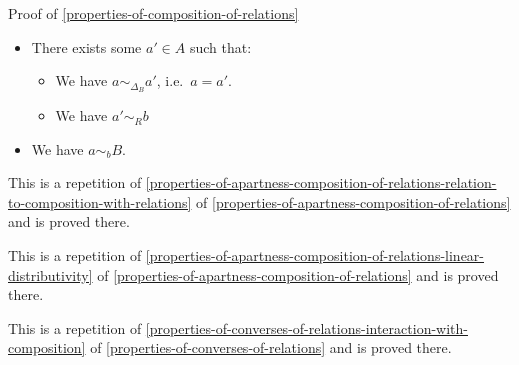 \begin{Proof}{Proof of \cref{properties-of-composition-of-relations}}
\begin{itemize}
            \begin{itemize}
                \item There exists some $a'\in A$ such that:
                    \begin{itemize}
                        \item We have $a\sim_{\Delta_{B}}a'$, i.e.\ $a=a'$.
                        \item We have $a'\sim_{R}b$
                    \end{itemize}
                \item We have $a\sim_{b}B$.
            \end{itemize}
    \end{itemize}

    This is a repetition of \cref{properties-of-apartness-composition-of-relations-relation-to-composition-with-relations} of \cref{properties-of-apartness-composition-of-relations} and is proved there.

    This is a repetition of \cref{properties-of-apartness-composition-of-relations-linear-distributivity} of \cref{properties-of-apartness-composition-of-relations} and is proved there.

    This is a repetition of \cref{properties-of-converses-of-relations-interaction-with-composition} of \cref{properties-of-converses-of-relations} and is proved there.


\end{Proof}
